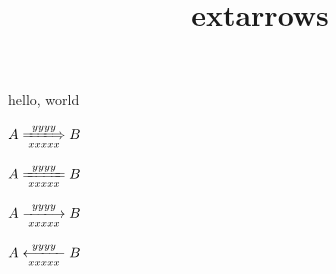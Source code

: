 \documentclass{amsart}
\title{extarrows}
\begin{document}
\maketitle

hello, world

$A \xLongrightarrow[xxxxx]{yyyy} B$

$A \xlongequal[xxxxx]{yyyy} B$

$A \xlongrightarrow[xxxxx]{yyyy} B$

$A \xlongleftarrow[xxxxx]{yyyy} B$
\end{document}
